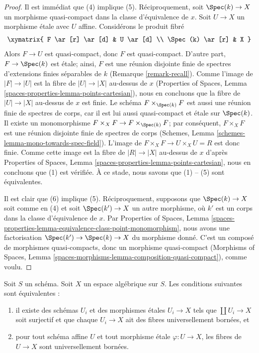 \begin{proof}
\medskip\noindent
Il est immédiat que (4) implique (5). Réciproquement, soit
$\Spec(k) \to X$ un morphisme quasi-compact dans la classe d'équivalence de
$x$. Soit $U \to X$ un morphisme étale avec $U$ affine. Considérons le
produit fibré
$$
\xymatrix{
F \ar[r] \ar[d] & U \ar[d] \\
\Spec(k) \ar[r] & X
}
$$
Alors $F \to U$ est quasi-compact, donc $F$ est quasi-compact.
D'autre part, $F \to \Spec(k)$ est étale; ainsi, $F$ est une
réunion disjointe finie de spectres d'extensions finies séparables de $k$
(Remarque \ref{remark-recall}). Comme l'image de $|F| \to |U|$
est la fibre de $|U| \to |X|$ au-dessus de $x$ (Properties of Spaces, Lemma
\ref{spaces-properties-lemma-points-cartesian}), nous en concluons que
la fibre de $|U| \to |X|$ au-dessus de $x$ est finie. Le schéma
$F \times_{\Spec(k)} F$ est aussi une réunion finie de spectres de corps,
car il est lui aussi quasi-compact et étale sur $\Spec(k)$.
Il existe un monomorphisme
$F \times_X F \to F \times_{\Spec(k)} F$; par conséquent, $F \times_X F$ est
une réunion disjointe finie de spectres de corps
(Schemes, Lemma \ref{schemes-lemma-mono-towards-spec-field}).
L'image de $F \times_X F \to U \times_X U = R$ est donc finie.
Comme cette image est la fibre de $|R| \to |X|$ au-dessus de $x$ d'après
Properties of Spaces, Lemma \ref{spaces-properties-lemma-points-cartesian},
nous en concluons que (1) est vérifiée. À ce stade, nous savons que
(1) -- (5) sont équivalentes.

\medskip\noindent
Il est clair que (6) implique (5). Réciproquement, supposons que
$\Spec(k) \to X$ soit comme en (4) et soit $\Spec(k') \to X$ un autre
morphisme, où $k'$ est un corps dans la classe d'équivalence de $x$. Par
Properties of Spaces, Lemma
\ref{spaces-properties-lemma-equivalence-class-point-monomorphism},
nous avons une factorisation $\Spec(k') \to \Spec(k) \to X$ du morphisme
donné. C'est un composé de morphismes quasi-compacts, donc un morphisme
quasi-compact (Morphisms of Spaces,
Lemma \ref{spaces-morphisms-lemma-composition-quasi-compact}), comme voulu.
\end{proof}

\begin{lemma}
\label{lemma-U-universally-bounded}
Soit $S$ un schéma. Soit $X$ un espace algébrique sur $S$.
Les conditions suivantes sont équivalentes :
\begin{enumerate}
\item il existe des schémas $U_i$ et des morphismes étales
$U_i \to X$ tels que $\coprod U_i \to X$ soit surjectif et que
chaque $U_i \to X$ ait des fibres universellement bornées, et
\item pour tout schéma affine $U$ et tout morphisme étale $\varphi : U \to X$,
les fibres de $U \to X$ sont universellement bornées.
\end{enumerate}
\end{lemma}

